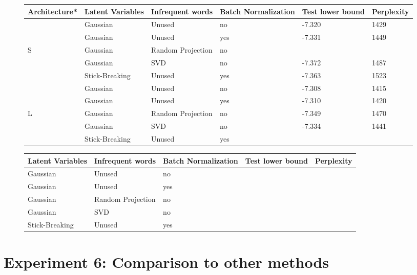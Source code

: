 \documentclass{report}
\begin{document}
	\begin{figure}
		\begin{tabular}{l l l l | l l}\label{comp_ny} 		
			Architecture* & Latent Variables & Infrequent words & Batch Normalization & Test lower bound & Perplexity  	\\ \hline
			&	Gaussian	&	Unused				&	no	&	-7.320 	& 1429 	\\ 
			&	Gaussian	&	Unused				&	yes  &	-7.331 	& 1449 	\\ 
			S	&	Gaussian	&	Random Projection	&	no	&	 	&   	\\ 
			&	Gaussian 	&	SVD					& no	&	-7.372 	& 1487	\\ 
			&	Stick-Breaking	&	Unused	&	yes &	-7.363& 1523			\\  \hline
			
			&	Gaussian	&	Unused				&	no	&	-7.308 	& 1415 	\\ 
			&	Gaussian	&	Unused				&	yes  &	 -7.310	& 1420 			\\ 
			L	&	Gaussian	&	Random Projection	&	no	&	 -7.349	&   1470	\\ 
			&	Gaussian 	&	SVD					& no	&	 -7.334	& 1441			\\ 
			&	Stick-Breaking	&	Unused	&	yes &	& 						\\  \hline
			
		\end{tabular}
	\end{figure}

	\begin{figure}
		\begin{tabular}{ l l l | l l}\label{comp_kos} 		
			  Latent Variables & Infrequent words & Batch Normalization & Test lower bound & Perplexity  	\\ \hline
				Gaussian	&	Unused				&	no	&	 	& \\ 
				Gaussian	&	Unused				&	yes  &	 	& \\ 
				Gaussian	&	Random Projection	&	no	&	 	& \\ 
				Gaussian 	&	SVD					& no	&	 	& \\ 
				Stick-Breaking	&	Unused	&	yes &	& \\  \hline
		\end{tabular}
	\end{figure}

\section{Experiment 6: Comparison to other methods}\label{exp6_res}
\end{document}
